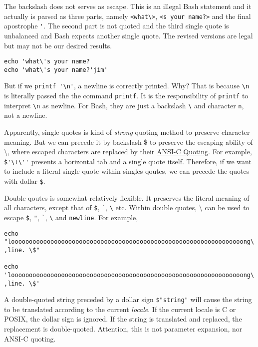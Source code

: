 The backslash does not serves as escape. This is an illegal Bash
statement and it actually is parsed as three parts, namely
\lstinline|<what\>|, \lstinline|<s your name?>| and the final
apostrophe \verb|'|. The second part is not quoted and the third
single quote is unbalanced and Bash expects another single
quote. The revised versions are legal but may not be our desired
results.

\begin{lstlisting}
echo 'what\'s your name?
echo 'what\'s your name?'jim'
\end{lstlisting}

But if we \lstinline|printf '\n'|, a newline is correctly
printed. Why? That is because \verb|\n| is literally passed the
the command \verb|printf|. It is the responsibility of
\verb|printf| to interpret \verb|\n| as newline. For Bash, they
are just a backslash \verb|\| and character \verb|n|, not a
newline.

Apparently, single quotes is kind of \textit{strong} quoting
method to preserve character meaning. But we can precede it by
backslash \$ to preserve the escaping ability of \textbackslash{},
where escaped characters are replaced by their
\href{https://www.gnu.org/software/bash/manual/bash.html#ANSI_002dC-Quoting}{ANSI-C
  Quoting}. For example,
\lstinline|$'\t\''| presents a horizontal tab and a single quote
itself. Therefore, if we want to include a literal single quote
within singles qoutes, we can precede the quotes with dollar
\lstinline|$|.

Double qoutes is somewhat relatively flexible. It preserves the
literal meaning of all characters, except that of
\lstinline|$|, \lstinline|`|, \lstinline|\| etc. Within double
quotes, \textbackslash{} can be used to escape \lstinline|$|,
\lstinline|"|, \lstinline|`|, \lstinline|\| and
\verb|newline|. For example,

\begin{lstlisting}
echo "looooooooooooooooooooooooooooooooooooooooooooooooooooooooooooooooong\
,line. \$"

echo 'looooooooooooooooooooooooooooooooooooooooooooooooooooooooooooooooong\
,line. \$'
\end{lstlisting}

A double-quoted string preceded by a dollar sign
\lstinline|$"string"| will cause the string to be translated
according to the current \textit{locale}.  If the current locale
is C or POSIX, the dollar sign is ignored.  If the string is
translated and replaced, the replacement is
double-quoted. Attention, this is not parameter expansion, nor
ANSI-C quoting.

